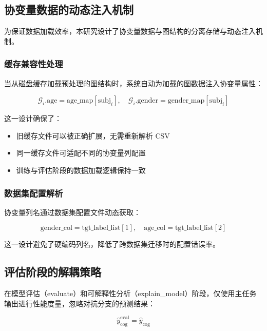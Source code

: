 \documentclass[UTF8, a4paper, 12pt]{article}
\begin{document}
\subsection{协变量数据的动态注入机制}

为保证数据加载效率，本研究设计了协变量数据与图结构的分离存储与动态注入机制。

\subsubsection{缓存兼容性处理}

当从磁盘缓存加载预处理的图结构时，系统自动为加载的图数据注入协变量属性：

\begin{equation}
\mathcal{G}_i.\text{age} = \text{age\_map}[\text{subj}_i], \quad \mathcal{G}_i.\text{gender} = \text{gender\_map}[\text{subj}_i]
\end{equation}

这一设计确保了：
\begin{itemize}
    \item 旧缓存文件可以被正确扩展，无需重新解析 CSV
    \item 同一缓存文件可适配不同的协变量列配置
    \item 训练与评估阶段的数据加载逻辑保持一致
\end{itemize}

\subsubsection{数据集配置解析}

协变量列名通过数据集配置文件动态获取：

\begin{equation}
\text{gender\_col} = \text{tgt\_label\_list}[1], \quad \text{age\_col} = \text{tgt\_label\_list}[2]
\end{equation}

这一设计避免了硬编码列名，降低了跨数据集迁移时的配置错误率。

\subsection{评估阶段的解耦策略}

在模型评估（evaluate）和可解释性分析（explain\_model）阶段，仅使用主任务输出进行性能度量，忽略对抗分支的预测结果：

\begin{equation}
\hat{y}_{\text{cog}}^{\text{eval}} = \hat{y}_{\text{cog}}
\end{equation}
\end{document}
